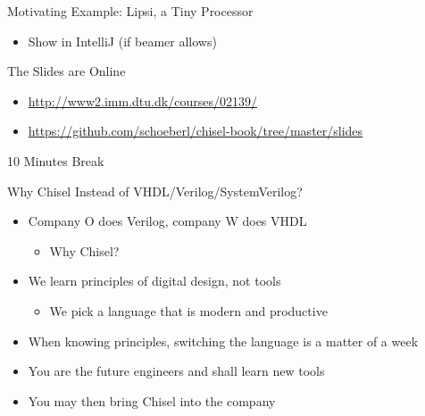 \begin{frame}[fragile]{Motivating Example: Lipsi, a Tiny Processor}
\begin{itemize}
\item Show in IntelliJ (if beamer allows)
\end{itemize}
\end{frame}

\begin{frame}[fragile]{The Slides are Online}
\begin{itemize}
\item \url{http://www2.imm.dtu.dk/courses/02139/}
\item \url{https://github.com/schoeberl/chisel-book/tree/master/slides}
\end{itemize}
\end{frame}

\begin{frame}[fragile]{10 Minutes Break}
\end{frame}

\begin{frame}[fragile]{Why Chisel Instead of VHDL/Verilog/SystemVerilog?}
\begin{itemize}
\item Company O does Verilog, company W does VHDL
\begin{itemize}
\item Why Chisel?
\end{itemize}
\item We learn principles of digital design, not tools
\begin{itemize}
\item We pick a language that is modern and productive
\end{itemize}
\item When knowing principles, switching the language is a matter of a week
\item You are the future engineers and shall learn new tools
\item You may then bring Chisel into the company
\end{itemize}
\end{frame}

